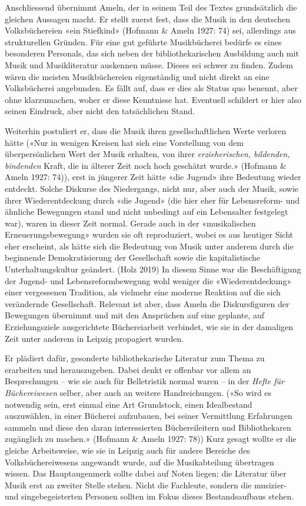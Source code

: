 \documentclass[a4paper,
fontsize=11pt,
oneside,
numbers=noperiodatend,
parskip=half-,
bibliography=totoc,
final
]{scrartcl}
\begin{document}
Anschliessend übernimmt Ameln, der in seinem Teil des Textes
grundsätzlich die gleichen Aussagen macht. Er stellt zuerst fest, dass
die Musik in den deutschen Volksbüchereien «ein Stiefkind» (Hofmann \&
Ameln 1927: 74) sei, allerdings aus strukturellen Gründen. Für eine gut
geführte Musikbücherei bedürfe es eines besonderen Personals, das sich
neben der bibliothekarischen Ausbildung auch mit Musik und
Musikliteratur auskennen müsse. Dieses sei schwer zu finden. Zudem wären
die meisten Musikbüchereien eigenständig und nicht direkt an eine
Volksbücherei angebunden. Es fällt auf, dass er dies als Status quo
benennt, aber ohne klarzumachen, woher er diese Kenntnisse hat.
Eventuell schildert er hier also seinen Eindruck, aber nicht den
tatsächlichen Stand.

Weiterhin postuliert er, dass die Musik ihren gesellschaftlichen Werte
verloren hätte («Nur in wenigen Kreisen hat sich eine Vorstellung von
dem überpersönlichen Wert der Musik erhalten, von ihrer
\emph{erzieherischen, bildenden, bindenden} Kraft, die in älterer Zeit
noch hoch geschätzt wurde.» (Hofmann \& Ameln 1927: 74)), erst in
jüngerer Zeit hätte «die Jugend» ihre Bedeutung wieder entdeckt. Solche
Diskurse des Niedergangs, nicht nur, aber auch der Musik, sowie ihrer
Wiederentdeckung durch «die Jugend» (die hier eher für Lebensreform- und
ähnliche Bewegungen stand und nicht unbedingt auf ein Lebensalter
festgelegt war), waren in dieser Zeit normal. Gerade auch in der
«musikalischen Erneuerungsbewegung» wurden sie oft reproduziert, wobei
es aus heutiger Sicht eher erscheint, als hätte sich die Bedeutung von
Musik unter anderem durch die beginnende Demokratisierung der
Gesellschaft sowie die kapitalistische Unterhaltungskultur geändert.
(Holz 2019) In diesem Sinne war die Beschäftigung der Jugend- und
Lebensreformbewegung wohl weniger die «Wiederentdeckung» einer
vergessenen Tradition, als vielmehr eine moderne Reaktion auf die sich
verändernde Gesellschaft. Relevant ist aber, dass Ameln die
Diskursfiguren der Bewegungen übernimmt und mit den Ansprüchen auf eine
geplante, auf Erziehungsziele ausgerichtete Büchereiarbeit verbindet,
wie sie in der damaligen Zeit unter anderem in Leipzig propagiert
wurden.

Er plädiert dafür, gesonderte bibliothekarische Literatur zum Thema zu
erarbeiten und herauszugeben. Dabei denkt er offenbar vor allem an
Besprechungen -- wie sie auch für Belletristik normal waren -- in der
\emph{Hefte für Büchereiwesen} selber, aber auch an weitere
Handreichungen. («So wird es notwendig sein, erst einmal eine Art
Grundstock, einen Idealbestand auszuwählen, in einer Bücherei
aufzubauen, bei seiner Vermittlung Erfahrungen sammeln und diese den
daran interessierten Büchereileitern und Bibliothekaren zugänglich zu
machen.» (Hofmann \& Ameln 1927: 78)) Kurz gesagt wollte er die gleiche
Arbeitsweise, wie sie in Leipzig auch für andere Bereiche des
Volksbüchereiwesens angewandt wurde, auf die Musikabteilung übertragen
wissen. Das Hauptaugenmerk sollte dabei auf Noten liegen; die Literatur
über Musik erst an zweiter Stelle stehen. Nicht die Fachleute, sondern
die musizier- und singebegeisterten Personen sollten im Fokus dieses
Bestandsaufbaus stehen.
\end{document}

